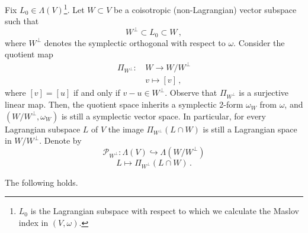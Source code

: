 \documentclass[10pt,a4paper]{amsart}
\numberwithin{equation}{section}
\renewcommand*\P{\mathcal{P}}
\theoremstyle{definition}
\theoremstyle{remark}
\begin{document}
Fix $L_0\in\Lambda(V)$\footnote{$L_0$ is the Lagrangian subspace with respect to which we calculate the Maslov index in $(V,\omega)$.}. Let $W\subset V$ be a coisotropic (non-Lagrangian) vector subspace such that
\[
W^\perp\subset L_0\subset W\,,
\]
where $W^\perp$ denotes the symplectic orthogonal with respect to $\omega$. Consider the quotient map
\begin{equation*}
\begin{aligned}
\Pi_{W^\perp}:& \,W\to W/W^\perp\\
&\,v\mapsto [v]\,,
\end{aligned}
\end{equation*}
where $[v]=[u]$ if and only if $v-u\in W^\perp$. Observe that $\Pi_{W^\perp}$ is a surjective linear map. Then, the quotient space inherits a symplectic 2-form $\omega_W$ from $\omega$, and $(W/W^\perp,\omega_W)$ is still a symplectic vector space. In particular, for every Lagrangian subspace $L$ of $V$ the image $\Pi_{W^\perp}(L\cap W)$ is still a Lagrangian space in $W/W^\perp$. Denote by
\[
\P_{W^\perp}:\Lambda(V)\hookrightarrow \Lambda\left(W/W^\perp\right)
\]
\[
L\mapsto \Pi_{W^\perp}(L\cap W)\,.
\]



The following holds.
\end{document}
